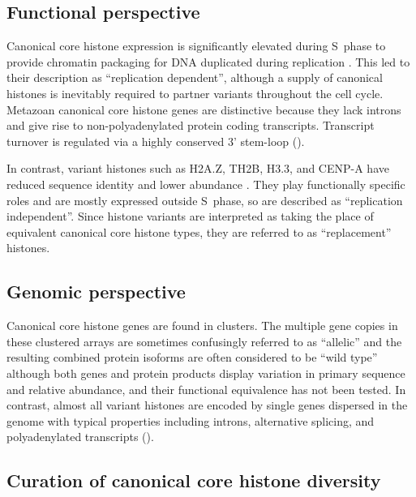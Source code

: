   \subsection{Functional perspective}

    Canonical core histone expression
    is significantly elevated during S~phase to provide chromatin packaging
    for DNA duplicated during replication \citep{WuBonner1981}.
    This led to their description as ``replication dependent'',
    although a supply of canonical histones is inevitably required
    to partner variants throughout the cell cycle.
    Metazoan canonical core histone genes are distinctive
    because they lack introns and give rise to non-polyadenylated protein coding transcripts.
    Transcript turnover is regulated via a highly conserved 3' stem-loop ().

    In contrast, variant histones such as H2A.Z, TH2B, H3.3, and CENP-A have
    reduced sequence identity and lower abundance \citep{TalbertHenikoff2010}.
    They play functionally specific roles and are mostly expressed outside S~phase,
    so are described as ``replication independent''.
    Since histone variants are interpreted as taking the place
    of equivalent canonical core histone types,
    they are referred to as ``replacement'' histones.

  \subsection{Genomic perspective}

    Canonical core histone genes are found in \NumberOfClusters{} clusters.
    The multiple gene copies in these clustered arrays are
    sometimes confusingly referred to as ``allelic''
    and the resulting combined protein isoforms are often considered to be ``wild type''
    although both genes and protein products display
    variation in primary sequence and relative abundance,
    and their functional equivalence has not been tested.
    In contrast, almost all variant histones are encoded by single genes dispersed in the genome
    with typical properties including introns, alternative splicing,
    and polyadenylated transcripts ().

  \subsection{Curation of canonical core histone diversity}

